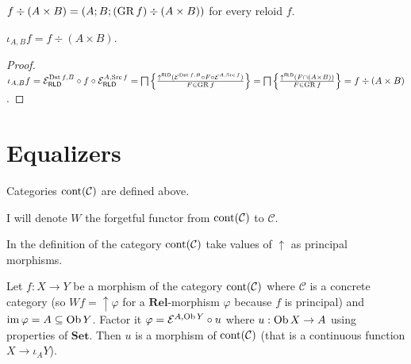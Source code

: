 \begin{defn}
  $f \div (A \times B) = (A ; B ; (\operatorname{GR} f) \div (A \times B))$ for every
  reloid $f$.
\end{defn}

\begin{prop}
  $\iota_{A, B} f = f \div (A \times B)$.
\end{prop}

\begin{proof}
  $\iota_{A, B} f = \mathcal{E}_{\mathsf{RLD}}^{\operatorname{Dst} f, B}
\circ f \circ \mathcal{E}_{\mathsf{RLD}}^{A, \operatorname{Src} f} =
\bigsqcap \left\{ \frac{ \uparrow^{\mathsf{RLD}} (\mathcal{E}^{\operatorname{Dst} f, B} \circ F \circ \mathcal{E}^{A, \operatorname{Src} f})
}{ F \in \operatorname{GR} f }\right\} = \bigsqcap \left\{ \frac{
\uparrow^{\mathsf{RLD}} (F \cap (A \times B))}{F \in \operatorname{GR} f }\right\} = f \div (A \times B)$.

\end{proof}

\section{Equalizers}

Categories $\operatorname{cont} (\mathcal{C})$ are defined above.

I will denote $W$ the forgetful functor from $\operatorname{cont}
(\mathcal{C})$ to $\mathcal{C}$.

In the definition of the category $\operatorname{cont} (\mathcal{C})$ take
values of $\uparrow$ as principal morphisms. 

\begin{lem}
  Let $f : X \rightarrow Y$ be a morphism of the category
  $\operatorname{cont} (\mathcal{C})$ where $\mathcal{C}$ is a concrete
  category (so $W f = \uparrow \varphi$ for a $\mathbf{Rel}$-morphism
  $\varphi$ because $f$ is principal) and $\operatorname{im} \varphi = A \subseteq
  \operatorname{Ob} Y$. Factor it $\varphi = \mathcal{E}^{A, \operatorname{Ob} Y} \circ u$
  where $u : \operatorname{Ob} X \rightarrow A$ using properties of
  $\mathbf{Set}$. Then $u$ is a morphism of $\operatorname{cont}
  (\mathcal{C})$ (that is a continuous function $X \rightarrow \iota_A Y$).
\end{lem}

